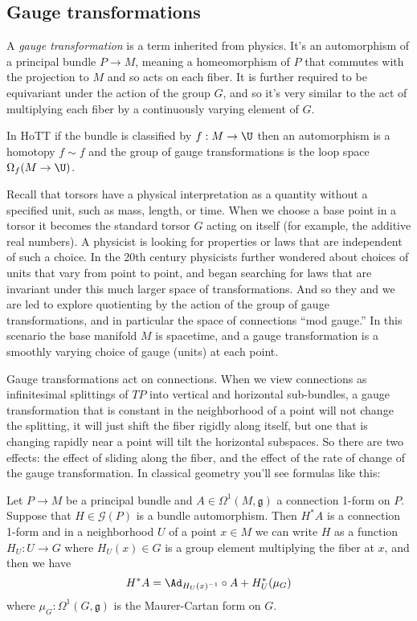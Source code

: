 \subsection{Gauge transformations}\label{gauge-transformations}

A \emph{gauge transformation} is a term inherited from physics. It's an
automorphism of a principal bundle \(P\to M\), meaning a homeomorphism
of \(P\) that commutes with the projection to \(M\) and so acts on each
fiber. It is further required to be equivariant under the action of the
group \(G\), and so it's very similar to the act of multiplying each
fiber by a continuously varying element of \(G\).

In HoTT if the bundle is classified by \(f:M\to \U\) then an
automorphism is a homotopy \(f\sim f\) and the group of gauge
transformations is the loop space \(\Omega_f(M\to \U)\).

Recall that torsors have a physical interpretation as a quantity without
a specified unit, such as mass, length, or time. When we choose a base
point in a torsor it becomes the standard torsor \(G\) acting on itself
(for example, the additive real numbers). A physicist is looking for
properties or laws that are independent of such a choice. In the 20th
century physicists further wondered about choices of units that vary
from point to point, and began searching for laws that are invariant
under this much larger space of transformations. And so they and we are
led to explore quotienting by the action of the group of gauge
transformations, and in particular the space of connections ``mod
gauge.'' In this scenario the base manifold \(M\) is spacetime, and a
gauge transformation is a smoothly varying choice of gauge (units) at
each point.

Gauge transformations act on connections. When we view connections as
infinitesimal splittings of \(TP\) into vertical and horizontal
sub-bundles, a gauge transformation that is constant in the neighborhood
of a point will not change the splitting, it will just shift the fiber
rigidly along itself, but one that is changing rapidly near a point will
tilt the horizontal subspaces. So there are two effects: the effect of
sliding along the fiber, and the effect of the rate of change of the
gauge transformation. In classical geometry you'll see formulas like
this:

\begin{mythm}
Let \( P\to M \) be a principal bundle and \( A\in\Omega^1(M,\mathfrak{g}) \) a connection 1-form on \( P \). Suppose that \( H\in \mathscr{G}(P) \) is a bundle automorphism. Then \( H^*A \) is a connection 1-form and in a neighborhood \( U \) of a point \( x\in M \) we can write \( H \) as a function \( H_U:U\to G \) where \( H_U(x)\in G \) is a group element multiplying the fiber at \( x \), and then we have
\[ 
H^*A=\Ad_{H_U(x)^{-1}}\circ A + H_U^*(\mu_G)
\] where \( \mu_G:\Omega^1(G,\mathfrak{g}) \) is the Maurer-Cartan form on \( G \).
\end{mythm}

